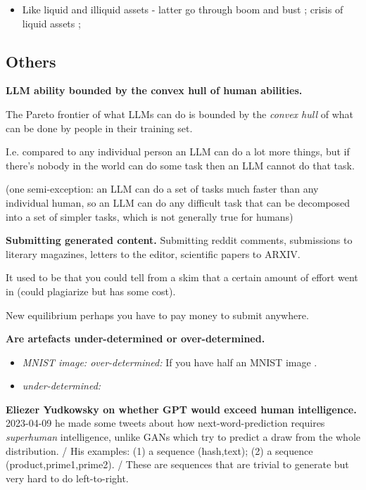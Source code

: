\documentclass[
  11pt,
  letterpaper,
  DIV=11,
  numbers=noendperiod,
  oneside]{scrartcl}
\providecommand{\tightlist}{%
  \setlength{\itemsep}{0pt}\setlength{\parskip}{0pt}}\usepackage{longtable,booktabs,array}
\begin{document}
\begin{itemize}
\tightlist
\item
  Like liquid and illiquid assets - latter go through boom and bust ;
  crisis of liquid assets ;
\end{itemize}

\hypertarget{others}{%
\subsection{Others}\label{others}}

\textbf{LLM ability bounded by the convex hull of human abilities.}

The Pareto frontier of what LLMs can do is bounded by the \emph{convex
hull} of what can be done by people in their training set.

I.e. compared to any individual person an LLM can do a lot more things,
but if there's nobody in the world can do some task then an LLM cannot
do that task.

(one semi-exception: an LLM can do a set of tasks much faster than any
individual human, so an LLM can do any difficult task that can be
decomposed into a set of simpler tasks, which is not generally true for
humans)

\textbf{Submitting generated content.} Submitting reddit comments,
submissions to literary magazines, letters to the editor, scientific
papers to ARXIV.

It used to be that you could tell from a skim that a certain amount of
effort went in (could plagiarize but has some cost).

New equilibrium perhaps you have to pay money to submit anywhere.

\textbf{Are artefacts under-determined or over-determined.}

\begin{itemize}
\item
  \emph{MNIST image: over-determined:} If you have half an MNIST image .
\item
  \emph{under-determined:}
\end{itemize}

\textbf{Eliezer Yudkowsky on whether GPT would exceed human
intelligence.} 2023-04-09 he made some tweets about how
next-word-prediction requires \emph{superhuman} intelligence, unlike
GANs which try to predict a draw from the whole distribution. / His
examples: (1) a sequence (hash,text); (2) a sequence
(product,prime1,prime2). / These are sequences that are trivial to
generate but very hard to do left-to-right.
\end{document}
